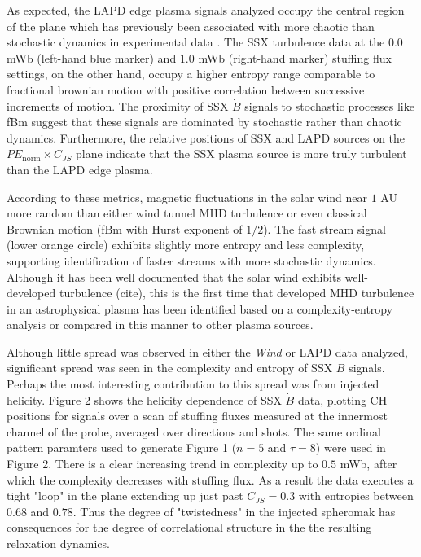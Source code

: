 \documentclass[aps,twocolumn,secnumarabic,nobalancelastpage,amsmath,amssymb,
nofootinbib]{revtex4-1}
\begin{document}
As expected, the LAPD edge plasma signals analyzed occupy the central region of the plane which has previously been associated with more chaotic than stochastic dynamics in experimental data \cite{maggs2013, gekelman2014}. The SSX turbulence data at the $0.0$ mWb (left-hand blue marker) and $1.0$ mWb (right-hand marker) stuffing flux settings, on the other hand, occupy a higher entropy range comparable to fractional brownian motion with positive correlation between successive increments of motion. The proximity of SSX $\dot{B}$ signals to stochastic processes like fBm suggest that these signals are dominated by stochastic rather than chaotic dynamics. Furthermore, the relative  positions of SSX and LAPD sources on the $PE_{\text{norm}} \times C_{JS}$ plane indicate that the SSX plasma source is more truly turbulent than the LAPD edge plasma. 

According to these metrics, magnetic fluctuations in the solar wind near $1$ AU more random than either wind tunnel MHD turbulence or even classical Brownian motion (fBm with Hurst exponent of $1/2$).  The fast stream signal (lower orange circle) exhibits slightly more entropy and less complexity, supporting identification of faster streams with more stochastic dynamics.  Although it has been well documented that the solar wind exhibits well-developed turbulence (cite), this is the first time that developed MHD turbulence in an astrophysical plasma has been identified based on a complexity-entropy analysis or compared in this manner to other plasma sources.

Although little spread was observed in either the \textit{Wind} or LAPD data analyzed, significant spread was seen in the complexity and entropy of SSX $\dot{B}$ signals. Perhaps the most interesting contribution to this spread was from injected helicity.  Figure 2 shows the helicity dependence of SSX $\dot{B}$ data, plotting CH positions for signals over a scan of stuffing fluxes measured at the innermost channel of the probe, averaged over directions and shots. The same ordinal pattern paramters used to generate Figure 1 ($n=5$ and $\tau=8$) were used in Figure 2. There is a clear increasing trend in complexity up to $0.5$ mWb, after which the complexity decreases with stuffing flux. As a result the data executes a tight "loop" in the plane extending up just past $C_{JS}=0.3$ with entropies between $0.68$ and $0.78$. Thus the degree of "twistedness" in the injected spheromak has consequences for the degree of correlational structure in the the resulting relaxation dynamics.
\end{document}

